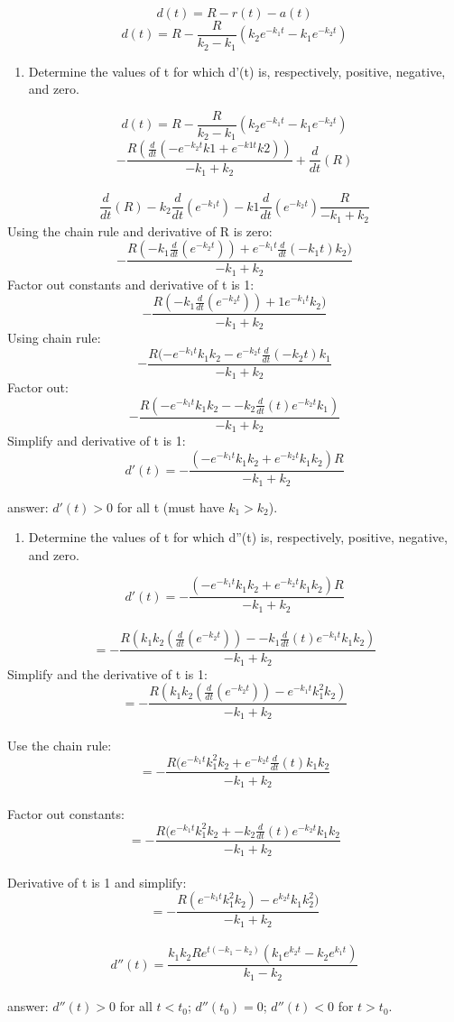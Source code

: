 \documentclass[]{article}
\providecommand{\tightlist}{%
  \setlength{\itemsep}{0pt}\setlength{\parskip}{0pt}}
\begin{document}
\[d(t) = R - r(t) - a(t)\]
\[d(t) = R - \frac{R}{k_2 - k_1}(k_2 e ^{-k_1 t} - k_1 e^{-k_2 t})\]

\begin{enumerate}
\def\labelenumi{(\alph{enumi})}
\tightlist
\item
  Determine the values of t for which d'(t) is, respectively, positive,
  negative, and zero.
\end{enumerate}

\[d(t) = R - \frac{R}{k_2 - k_1}(k_2 e ^{-k_1 t} - k_1 e^{-k_2 t})\]
\[- \frac{R (\frac{d}{dt} (-e^{-k_2 t} k1 + e^{-k1t}k2))}{-k_1 + k_2} + \frac{d}{dt} (R)\]\\
\[\frac{d}{dt}(R) - k_2 \frac{d}{dt}(e^{-k_1 t})-k1\frac{d}{dt}(e^{-k_2 t})\frac{R}{-k_1 + k_2}\]
Using the chain rule and derivative of R is zero:
\[- \frac{R(-k_1 \frac{d}{dt}(e^{-k_2 t})) + e^{-k_1 t}\frac{d}{dt}(-k_1 t)k_2)}{-k_1 + k_2}\]
Factor out constants and derivative of t is 1:
\[- \frac{R(-k_1 \frac{d}{dt}(e^{-k_2 t})) + 1e^{-k_1 t}k_2)}{-k_1 + k_2}\]
Using chain rule:
\[- \frac{R(-e^{-k_1 t}k_1 k_2 - e^{-k_2 t} \frac{d}{dt} (-k_2 t)k_1}{-k_1 + k_2}\]
Factor out:
\[- \frac{R(-e^{-k_1 t}k_1 k_2 - -k_2 \frac{d}{dt}(t)e^{-k_2 t}k_1)}{-k_1 + k_2}\]
Simplify and derivative of t is 1:
\[d'(t) = -\frac{(-e^{-k_1 t}k_1 k_2 + e^{-k_2 t}k_1 k_2)R}{-k_1 + k_2}\]

answer: \(d'(t) > 0\) for all t (must have \(k_1 > k_2\)).

\begin{enumerate}
\def\labelenumi{(\alph{enumi})}
\setcounter{enumi}{1}
\tightlist
\item
  Determine the values of t for which d''(t) is, respectively, positive,
  negative, and zero.
\end{enumerate}

\[d'(t) = -\frac{(-e^{-k_1 t}k_1 k_2 + e^{-k_2 t}k_1 k_2)R}{-k_1 + k_2}\]\\
\[= -\frac{R(k_1 k_2 (\frac{d}{dt}(e^{-k_2 t})) - -k_1 \frac{d}{dt}(t)e^{-k_1 t}k_1 k_2 )}{-k_1 + k_2}\]
Simplify and the derivative of t is 1:
\[= -\frac{R(k_1 k_2 (\frac{d}{dt}(e^{-k_2 t})) - e^{-k_1 t}k_1^2 k_2 )}{-k_1 + k_2}\]\\
Use the chain rule:
\[= -\frac{R(e^{-k_1 t}k_1^2 k_2 + e^{-k_2 t} \frac{d}{dt}(t)k_1 k_2 }{-k_1 + k_2}\]\\
Factor out constants:
\[= -\frac{R(e^{-k_1 t}k_1^2 k_2 + - k_2 \frac{d}{dt}(t) e^{-k_2 t}k_1 k_2} {-k_1 + k_2}\]\\
Derivative of t is 1 and simplify:
\[= - \frac{R (e^{-k_1 t}k_1^2 k_2) - e^{k_2 t} k_1 k_2^2)}{-k_1 + k_2}\]\\
\[d''(t) = \frac{k_1 k_2 R e^{t(-k_1-k_2)}(k_1 e^{k_2 t}-k_2 e^{k_1 t})}{k_1 - k_2}\]\\
answer: \(d''(t) > 0\) for all \(t < t_0\); \(d''(t_0) =0\);
\(d''(t) < 0\) for \(t > t_0\).
\end{document}
